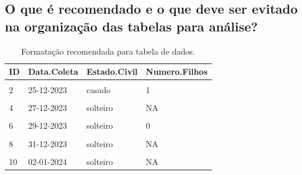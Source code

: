 \documentclass[
  a4paper,
]{book}
\begin{document}
\hypertarget{o-que-uxe9-recomendado-e-o-que-deve-ser-evitado-na-organizauxe7uxe3o-das-tabelas-para-anuxe1lise}{%
\subsection{O que é recomendado e o que deve ser evitado na organização das tabelas para análise?}\label{o-que-uxe9-recomendado-e-o-que-deve-ser-evitado-na-organizauxe7uxe3o-das-tabelas-para-anuxe1lise}}

\begin{table}

\caption{\label{tab:tabela-recomendada}Formatação recomendada para tabela de dados.}
\centering
\begin{tabu} to 
\toprule
\textbf{ID} & \textbf{Data.Coleta} & \textbf{Estado.Civil} & \textbf{Numero.Filhos}\\
\midrule
{} &  &  & \\
2 & 25-12-2023 & casado & 1\\
 &  &  & \\
4 & 27-12-2023 & solteiro & NA\\
 &  &  & \\
6 & 29-12-2023 & solteiro & 0\\
 &  &  & \\
8 & 31-12-2023 & solteiro & NA\\
 &  &  & \\
10 & 02-01-2024 & solteiro & NA\\
\bottomrule
\end{tabu}
\end{table}
\end{document}
